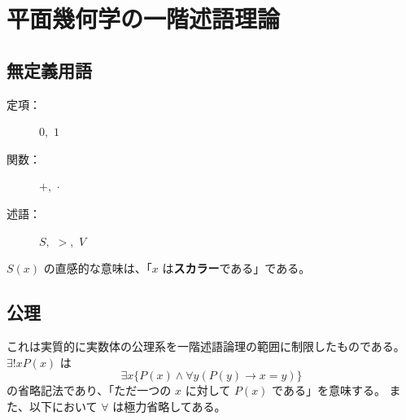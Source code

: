 \chapter{平面幾何学の一階述語理論}



\section{無定義用語}

\begin{description}
  \item[定項：] \(0,\) \(1\)
  \item[関数：] \(+,\) \(\cdot\)
  \item[述語：] \(S,\) \(>,\) \(V\)
\end{description}

\(S(x)\) の直感的な意味は、「\(x\) は\textbf{スカラー}である」である。



\section{公理}\label{261008235001}

これは実質的に実数体の公理系を一階述語論理の範囲に制限したものである。
\(\exists!xP(x)\) は
\[\exists x\{P(x)\land\forall y(P(y)\rightarrow x=y)\}\]
の省略記法であり、「ただ一つの \(x\) に対して \(P(x)\) である」を意味する。
また、以下において \(\forall\) は極力省略してある。

